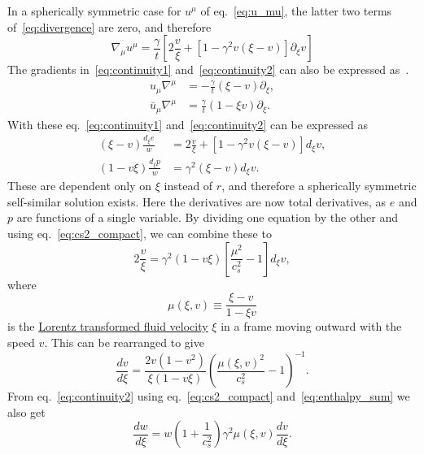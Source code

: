 In a spherically symmetric case for $u^\mu$ of eq.~\eqref{eq:u_mu},
the latter two terms of~\eqref{eq:divergence} are zero, and therefore
\begin{equation}
\nabla_\mu u^\mu = \frac{\gamma}{t} \left[ 2\frac{v}{\xi} + \left[1 - \gamma^2 v (\xi - v) \right] \partial_\xi v \right]
\end{equation}
The gradients in~\eqref{eq:continuity1} and~\eqref{eq:continuity2} can also be expressed as~\cite[eq. 25]{espinosa_energy_2010}.
\begin{align}
u_\mu \nabla^\mu &= - \frac{\gamma}{t} (\xi - v) \partial_\xi, \\
\bar{u}_\mu \nabla^\mu &= \frac{\gamma}{t} (1 - \xi v) \partial_\xi.
\end{align}
With these eq.~\eqref{eq:continuity1} and~\eqref{eq:continuity2} can be expressed as
\begin{align}
(\xi - v) \frac{d_\xi e}{w} &= 2 \frac{v}{\xi} + \left[ 1 - \gamma^2 v (\xi - v) \right] d_\xi v, \\
(1 - v\xi) \frac{d_\xi p}{w} &= \gamma^2 (\xi - v) d_\xi v.
\end{align}
These are dependent only on $\xi$ instead of $r$,
and therefore a spherically symmetric self-similar solution exists.
Here the derivatives are now total derivatives, as $e$ and $p$ are functions of a single variable.
By dividing one equation by the other and using eq.~\eqref{eq:cs2_compact}, we can combine these to
\begin{equation}
2 \frac{v}{\xi} = \gamma^2 (1 - v\xi) \left[ \frac{\mu^2}{c_s^2} - 1 \right] d_\xi v,
\label{eq:continuity_combined}
\end{equation}
where
\begin{equation}
\mu(\xi,v) \equiv \frac{\xi - v}{1 - \xi v}
\label{eq:mu}
\end{equation}
is the
\href{https://en.wikipedia.org/wiki/Velocity-addition_formula#Standard_configuration}{Lorentz transformed fluid velocity}
$\xi$ in a frame moving outward with the speed $v$.
This can be rearranged to give
\cites[eq. 7.30-7.31]{lecture_notes}[eq. 5]{giese_2021}
\begin{equation}
\frac{dv}{d\xi} = \frac{2v(1-v^2)}{\xi(1-v\xi)} \left( \frac{\mu(\xi,v)^2}{c_s^2} - 1 \right)^{-1}.
\label{eq:hydro_diff1}
\end{equation}
From eq.~\eqref{eq:continuity2} using eq.~\eqref{eq:cs2_compact} and~\eqref{eq:enthalpy_sum} we also get
\begin{equation}
\frac{dw}{d\xi} = w \left( 1 + \frac{1}{c_s^2} \right) \gamma^2 \mu(\xi,v) \frac{dv}{d\xi}.
\label{eq:hydro_diff2}
\end{equation}

